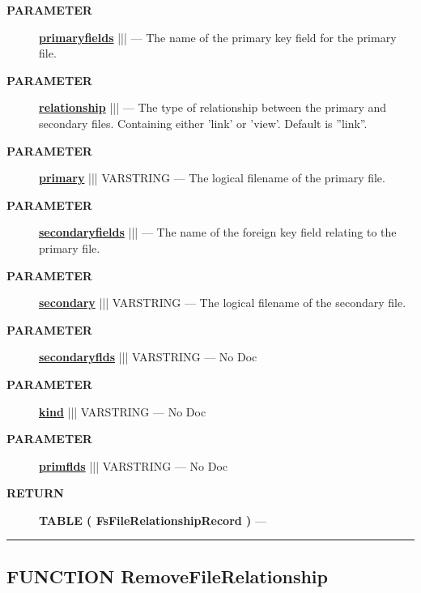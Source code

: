 \par
\begin{description}
\item [\colorbox{tagtype}{\color{white} \textbf{\textsf{PARAMETER}}}] \textbf{\underline{primaryfields}} |||  --- The name of the primary key field for the primary file.
\item [\colorbox{tagtype}{\color{white} \textbf{\textsf{PARAMETER}}}] \textbf{\underline{relationship}} |||  --- The type of relationship between the primary and secondary files. Containing either 'link' or 'view'. Default is ''link''.
\item [\colorbox{tagtype}{\color{white} \textbf{\textsf{PARAMETER}}}] \textbf{\underline{primary}} ||| VARSTRING --- The logical filename of the primary file.
\item [\colorbox{tagtype}{\color{white} \textbf{\textsf{PARAMETER}}}] \textbf{\underline{secondaryfields}} |||  --- The name of the foreign key field relating to the primary file.
\item [\colorbox{tagtype}{\color{white} \textbf{\textsf{PARAMETER}}}] \textbf{\underline{secondary}} ||| VARSTRING --- The logical filename of the secondary file.
\item [\colorbox{tagtype}{\color{white} \textbf{\textsf{PARAMETER}}}] \textbf{\underline{secondaryflds}} ||| VARSTRING --- No Doc
\item [\colorbox{tagtype}{\color{white} \textbf{\textsf{PARAMETER}}}] \textbf{\underline{kind}} ||| VARSTRING --- No Doc
\item [\colorbox{tagtype}{\color{white} \textbf{\textsf{PARAMETER}}}] \textbf{\underline{primflds}} ||| VARSTRING --- No Doc
\end{description}







\par
\begin{description}
\item [\colorbox{tagtype}{\color{white} \textbf{\textsf{RETURN}}}] \textbf{TABLE ( FsFileRelationshipRecord )} --- 
\end{description}




\rule{\linewidth}{0.5pt}
\subsection*{\textsf{\colorbox{headtoc}{\color{white} FUNCTION}
RemoveFileRelationship}}

